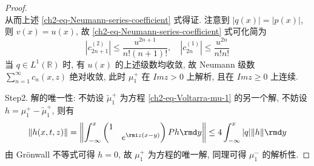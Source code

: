 \begin{proof}
\begin{equation}
    \end{equation}
    从而上述 \eqref{ch2-eq-Neumann-series-coefficient} 式得证. 注意到 $ | q(x) |  = | p(x) |$, 则 $ v(x) = u(x) $, 故 \eqref{ch2-eq-Neumann-series-coefficient} 式可化简为
    \begin{equation}
        | c_{2n+1}^{(2)} | \leq \frac{u^{2n+1}}{n!(n+1)!}, \quad | c_{2n}^{(1)} | \leq \frac{u^{2n}}{n!n!}
    \end{equation}
    当 $ q \in L^1(\mathbb{R}) $ 时, 有 $ u(x) $ 的上述级数均收敛, 故 Neumann 级数 $ \sum_{n=1}^{\infty} c_{n}(x,z) $ 绝对收敛, 此时 $ \mu_{1}^{+} $ 在 $ Im z > 0 $ 上解析, 且在 $ Im z \geq 0 $ 上连续.

    Step2. 解的唯一性: 不妨设 $ \tilde{\mu}_{1}^{+} $ 为方程 \eqref{ch2-eq-Voltarra-mu-1} 的另一个解, 不妨设 $ h = \mu_{1}^{+} - \tilde{\mu}_{1}^{+} $, 则有
    \begin{equation}
        \| h(x,t,z) \| = \left\| \int_{-\infty}^{x} \begin{pmatrix} 1 &  \\  & e^{ \rmi z (x - y)} \end{pmatrix} P h \rmd y \right\| \leq 4 \int_{-\infty}^{x} | q | \|  h \| \rmd y
    \end{equation}
    由 Grönwall 不等式可得 $ h = 0 $, 故 $ \mu_{1}^{+} $ 为方程的唯一解, 同理可得 $ \mu_{1}^{-} $ 的解析性.
\end{proof}

